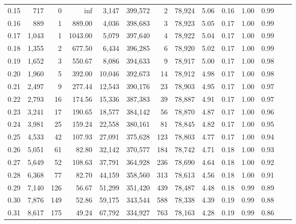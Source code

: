 \begin{tabular}{rrrrrrrrrrrrrr}
0.15 &     717 &      0 &      inf &    3,147 &  399,572 &       2 &  78,924 &  5.06 &  0.16 &  1.00 &      0.99 \\
0.16 &     889 &      1 &   889.00 &    4,036 &  398,683 &       3 &  78,923 &  5.05 &  0.17 &  1.00 &      0.99 \\
0.17 &   1,043 &      1 &  1043.00 &    5,079 &  397,640 &       4 &  78,922 &  5.04 &  0.17 &  1.00 &      0.99 \\
0.18 &   1,355 &      2 &   677.50 &    6,434 &  396,285 &       6 &  78,920 &  5.02 &  0.17 &  1.00 &      0.99 \\
0.19 &   1,652 &      3 &   550.67 &    8,086 &  394,633 &       9 &  78,917 &  5.00 &  0.17 &  1.00 &      0.98 \\
0.20 &   1,960 &      5 &   392.00 &   10,046 &  392,673 &      14 &  78,912 &  4.98 &  0.17 &  1.00 &      0.98 \\
0.21 &   2,497 &      9 &   277.44 &   12,543 &  390,176 &      23 &  78,903 &  4.95 &  0.17 &  1.00 &      0.97 \\
0.22 &   2,793 &     16 &   174.56 &   15,336 &  387,383 &      39 &  78,887 &  4.91 &  0.17 &  1.00 &      0.97 \\
0.23 &   3,241 &     17 &   190.65 &   18,577 &  384,142 &      56 &  78,870 &  4.87 &  0.17 &  1.00 &      0.96 \\
0.24 &   3,981 &     25 &   159.24 &   22,558 &  380,161 &      81 &  78,845 &  4.82 &  0.17 &  1.00 &      0.95 \\
0.25 &   4,533 &     42 &   107.93 &   27,091 &  375,628 &     123 &  78,803 &  4.77 &  0.17 &  1.00 &      0.94 \\
0.26 &   5,051 &     61 &    82.80 &   32,142 &  370,577 &     184 &  78,742 &  4.71 &  0.18 &  1.00 &      0.93 \\
0.27 &   5,649 &     52 &   108.63 &   37,791 &  364,928 &     236 &  78,690 &  4.64 &  0.18 &  1.00 &      0.92 \\
0.28 &   6,368 &     77 &    82.70 &   44,159 &  358,560 &     313 &  78,613 &  4.56 &  0.18 &  1.00 &      0.91 \\
0.29 &   7,140 &    126 &    56.67 &   51,299 &  351,420 &     439 &  78,487 &  4.48 &  0.18 &  0.99 &      0.89 \\
0.30 &   7,876 &    149 &    52.86 &   59,175 &  343,544 &     588 &  78,338 &  4.39 &  0.19 &  0.99 &      0.88 \\
0.31 &   8,617 &    175 &    49.24 &   67,792 &  334,927 &     763 &  78,163 &  4.28 &  0.19 &  0.99 &      0.86 \\

\end{tabular}
